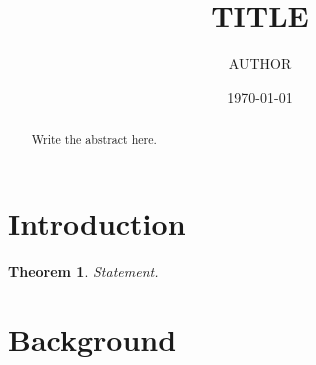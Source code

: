 \documentclass[11pt]{amsart}
\theoremstyle{plain}
\newtheorem{theorem}{Theorem}[section]
\theoremstyle{definition}
\theoremstyle{remark}
\begin{document}
\title{{{TITLE}}}
\author{{{AUTHOR}}}
\address{Department of Mathematics, University, City, Country}
\date{\today}

\begin{abstract}
Write the abstract here.
\end{abstract}

\maketitle
\tableofcontents

\section{Introduction}
\begin{theorem}\label{thm:main}
Statement.
\end{theorem}

\section{Background}



\end{document}
